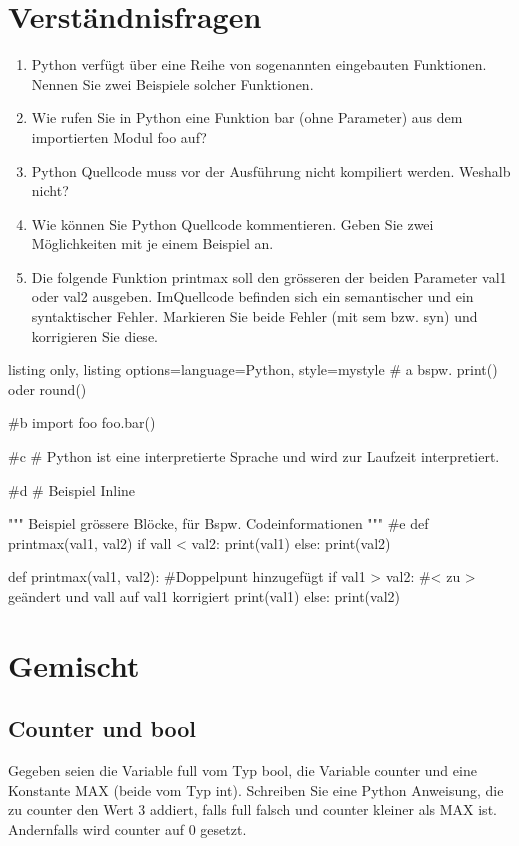 \documentclass[11pt, oneside]{book}
\begin{document}
\section{Verständnisfragen}
\begin{enumerate}
    \item Python verfügt über eine Reihe von sogenannten eingebauten Funktionen. Nennen Sie zwei Beispiele solcher Funktionen.
    \item Wie rufen Sie in Python eine Funktion bar (ohne Parameter) aus dem importierten Modul foo auf?
    \item Python Quellcode muss vor der Ausführung nicht kompiliert werden. Weshalb nicht?
    \item Wie können Sie Python Quellcode kommentieren. Geben Sie zwei Möglichkeiten mit je einem Beispiel an.
    \item Die folgende Funktion printmax soll den grösseren der beiden Parameter val1 oder val2 ausgeben. ImQuellcode befinden sich ein semantischer und ein syntaktischer Fehler. Markieren Sie beide Fehler (mit sem bzw. syn) und korrigieren Sie diese.
\end{enumerate}

\begin{tcblisting}{listing only, listing options={language=Python, style=mystyle}}
# a bspw. print() oder round()

#b 
import foo
foo.bar()

#c
# Python ist eine interpretierte Sprache und wird zur Laufzeit interpretiert.

#d
# Beispiel Inline

"""
Beispiel grössere Blöcke, für Bspw. Codeinformationen
"""
#e
def printmax(val1, val2)
    if vall < val2:
        print(val1)
    else:
        print(val2)

def printmax(val1, val2): #Doppelpunt hinzugefügt
    if val1 > val2: #< zu > geändert und vall auf val1 korrigiert
        print(val1)
    else:
        print(val2)
\end{tcblisting}

\newpage
\section{Gemischt}
\subsection{Counter und bool}
Gegeben seien die Variable full vom Typ bool, die Variable counter und eine Konstante MAX (beide vom Typ int). Schreiben Sie eine Python Anweisung, die zu counter den Wert 3 addiert, falls full falsch und counter kleiner als MAX ist. Andernfalls wird counter auf 0 gesetzt.
\end{document}
